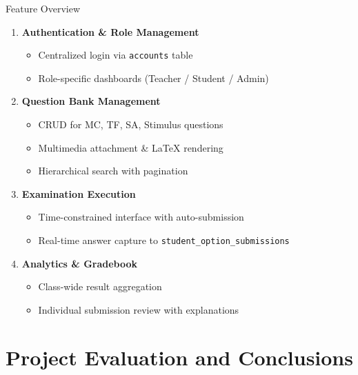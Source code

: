 \documentclass[aspectratio=169, 10pt]{beamer}
\begin{document}
\begin{frame}{Feature Overview}
    \begin{enumerate}
        \item \textbf{Authentication \& Role Management}
        \begin{itemize}
            \item Centralized login via \texttt{accounts} table
            \item Role-specific dashboards (Teacher / Student / Admin)
        \end{itemize}
        \item \textbf{Question Bank Management}
        \begin{itemize}
            \item CRUD for MC, TF, SA, Stimulus questions
            \item Multimedia attachment \& LaTeX rendering
            \item Hierarchical search with pagination
        \end{itemize}
        \item \textbf{Examination Execution}
        \begin{itemize}
            \item Time-constrained interface with auto-submission
            \item Real-time answer capture to \texttt{student\_option\_submissions}
        \end{itemize}
        \item \textbf{Analytics \& Gradebook}
        \begin{itemize}
            \item Class-wide result aggregation
            \item Individual submission review with explanations
        \end{itemize}
    \end{enumerate}
\end{frame}



\section{Project Evaluation and Conclusions}
\end{document}
